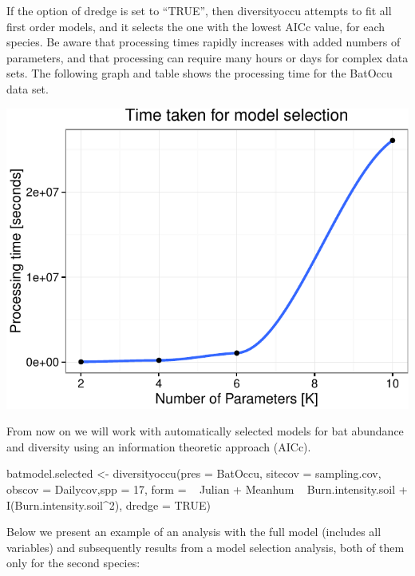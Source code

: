 \documentclass[article]{jss}
\begin{document}
If the option of dredge is set to ``TRUE'', then diversityoccu attempts
to fit all first order models, and it selects the one with the lowest
AICc value, for each species. Be aware that processing times rapidly
increases with added numbers of parameters, and that processing can
require many hours or days for complex data sets. The following graph
and table shows the processing time for the BatOccu data set.

\begin{CodeChunk}


\begin{center}\includegraphics{diversityocc_files/figure-latex/unnamed-chunk-12-1} \end{center}

\end{CodeChunk}

From now on we will work with automatically selected models for bat
abundance and diversity using an information theoretic approach (AICc).

\begin{CodeChunk}
\begin{CodeInput}
batmodel.selected <- diversityoccu(pres = BatOccu, sitecov = sampling.cov, obscov = Dailycov,spp = 17, form = ~ Julian + Meanhum ~ Burn.intensity.soil + I(Burn.intensity.soil^2), dredge = TRUE)
\end{CodeInput}
\end{CodeChunk}

Below we present an example of an analysis with the full model (includes
all variables) and subsequently results from a model selection analysis,
both of them only for the second species:
\end{document}
